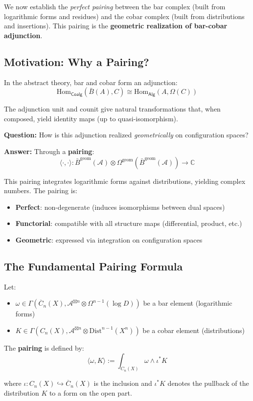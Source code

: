 We now establish the \emph{perfect pairing} between the bar complex (built from logarithmic
forms and residues) and the cobar complex (built from distributions and insertions).
This pairing is the \textbf{geometric realization of bar-cobar adjunction}.

\subsection{Motivation: Why a Pairing?}

\begin{motivation}\label{mot:pairing-geometric}
In the abstract theory, bar and cobar form an adjunction:
$$\text{Hom}_{\mathsf{Coalg}}(\bar{B}(A), C) \cong \text{Hom}_{\mathsf{Alg}}(A, \Omega(C))$$

The adjunction unit and counit give natural transformations that, when composed, yield
identity maps (up to quasi-isomorphism).

\textbf{Question:} How is this adjunction realized \emph{geometrically} on configuration spaces?

\textbf{Answer:} Through a \textbf{pairing}:
$$\langle \cdot, \cdot \rangle: \bar{B}^{\text{geom}}(\mathcal{A}) \otimes 
\Omega^{\text{geom}}(\bar{B}^{\text{geom}}(\mathcal{A})) \to \mathbb{C}$$

This pairing integrates logarithmic forms against distributions, yielding complex numbers.
The pairing is:
\begin{itemize}
\item \textbf{Perfect}: non-degenerate (induces isomorphisms between dual spaces)
\item \textbf{Functorial}: compatible with all structure maps (differential, product, etc.)
\item \textbf{Geometric}: expressed via integration on configuration spaces
\end{itemize}
\end{motivation}

\subsection{The Fundamental Pairing Formula}

\begin{definition}\label{def:pairing-fundamental}
Let:
\begin{itemize}
\item $\omega \in \Gamma(\overline{C}_n(X), \mathcal{A}^{\boxtimes n} \otimes \Omega^{n-1}(\log D))$
be a bar element (logarithmic forms)
\item $K \in \Gamma(C_n(X), \mathcal{A}^{\boxtimes n} \otimes \text{Dist}^{n-1}(X^n))$
be a cobar element (distributions)
\end{itemize}

The \textbf{pairing} is defined by:
$$\langle \omega, K \rangle := \int_{C_n(X)} \omega \wedge \iota^* K$$

where $\iota: C_n(X) \hookrightarrow \overline{C}_n(X)$ is the inclusion and
$\iota^* K$ denotes the pullback of the distribution $K$ to a form on the open part.
\end{definition}

